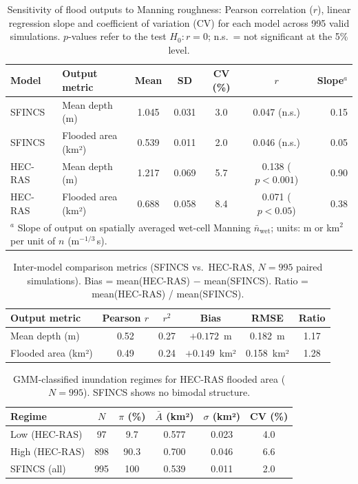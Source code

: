 \documentclass[review,12pt]{elsarticle}
\newcommand{\sfincs}{\textsc{SFINCS}}
\newcommand{\hecras}{\textsc{HEC-RAS}}
\begin{document}
\begin{table}[htbp]
\centering
\caption{Sensitivity of flood outputs to Manning roughness: Pearson
correlation ($r$), linear regression slope and coefficient of variation
(CV) for each model across 995 valid simulations.
$p$-values refer to the test $H_0: r = 0$; n.s.\ = not significant
at the 5\% level.}
\label{tab:sensitivity}
\footnotesize
\setlength{\tabcolsep}{5pt}
\begin{tabular}{llccccr}
\toprule
Model & Output metric & Mean & SD & CV (\%) &
$r$ & Slope$^{a}$ \\
\midrule
\sfincs{}  & Mean depth (m)     & 1.045 & 0.031 & 3.0 & 0.047 (n.s.)      & 0.15 \\
\sfincs{}  & Flooded area (km²) & 0.539 & 0.011 & 2.0 & 0.046 (n.s.)      & 0.05 \\
\hecras{}  & Mean depth (m)     & 1.217 & 0.069 & 5.7 & 0.138 ($p<0.001$) & 0.90 \\
\hecras{}  & Flooded area (km²) & 0.688 & 0.058 & 8.4 & 0.071 ($p<0.05$)  & 0.38 \\
\bottomrule
\multicolumn{7}{l}{$^{a}$ Slope of output on spatially averaged wet-cell Manning $\bar{n}_{\mathrm{wet}}$;
  units: m or km$^2$ per unit of $n$ (m$^{-1/3}$\,s).}
\end{tabular}
\end{table}


\begin{table}[htbp]
\centering
\caption{Inter-model comparison metrics (\sfincs{} vs.\ \hecras{},
$N = 995$ paired simulations).
Bias = mean(\hecras{}) $-$ mean(\sfincs{}).
Ratio = mean(\hecras{}) / mean(\sfincs{}).}
\label{tab:intermodel}
\small
\begin{tabular}{lccccc}
\toprule
Output metric & Pearson $r$ & $r^2$ & Bias & RMSE & Ratio \\
\midrule
Mean depth (m)       & 0.52 & 0.27 & $+0.172$~m   & 0.182~m   & 1.17 \\
Flooded area (km²)   & 0.49 & 0.24 & $+0.149$~km² & 0.158~km² & 1.28 \\
\bottomrule
\end{tabular}
\end{table}


\begin{table}[htbp]
\centering
\caption{GMM-classified inundation regimes for \hecras{} flooded area
($N = 995$). \sfincs{} shows no bimodal structure.}
\label{tab:gmm}
\small
\begin{tabular}{lccccc}
\toprule
Regime & $N$ & $\pi$ (\%) & $\bar{A}$ (km²) & $\sigma$ (km²) & CV (\%) \\
\midrule
Low  (HEC-RAS) &  97 &  9.7 & 0.577 & 0.023 & 4.0 \\
High (HEC-RAS) & 898 & 90.3 & 0.700 & 0.046 & 6.6 \\
\midrule
SFINCS (all)   & 995 & 100  & 0.539 & 0.011 & 2.0 \\
\bottomrule
\end{tabular}
\end{table}
\end{document}
